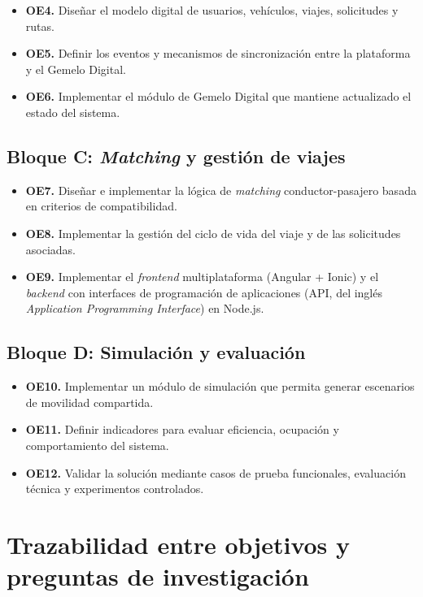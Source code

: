 \begin{itemize}
    \item \textbf{OE4.} Diseñar el modelo digital de usuarios, vehículos, viajes, solicitudes y rutas.
    \item \textbf{OE5.} Definir los eventos y mecanismos de sincronización entre la plataforma y el Gemelo Digital.
    \item \textbf{OE6.} Implementar el módulo de Gemelo Digital que mantiene actualizado el estado del sistema.
\end{itemize}

\subsection{Bloque C: \textit{Matching} y gestión de viajes}

\begin{itemize}
    \item \textbf{OE7.} Diseñar e implementar la lógica de \textit{matching} conductor-pasajero basada en criterios de compatibilidad.
    \item \textbf{OE8.} Implementar la gestión del ciclo de vida del viaje y de las solicitudes asociadas.
    \item \textbf{OE9.} Implementar el \textit{frontend} multiplataforma (Angular + Ionic) y el \textit{backend} con interfaces de programación de aplicaciones (API, del inglés \textit{Application Programming Interface}) en Node.js.
\end{itemize}

\subsection{Bloque D: Simulación y evaluación}

\begin{itemize}
    \item \textbf{OE10.} Implementar un módulo de simulación que permita generar escenarios de movilidad compartida.
    \item \textbf{OE11.} Definir indicadores para evaluar eficiencia, ocupación y comportamiento del sistema.
    \item \textbf{OE12.} Validar la solución mediante casos de prueba funcionales, evaluación técnica y experimentos controlados.
\end{itemize}

\section{Trazabilidad entre objetivos y preguntas de investigación}

